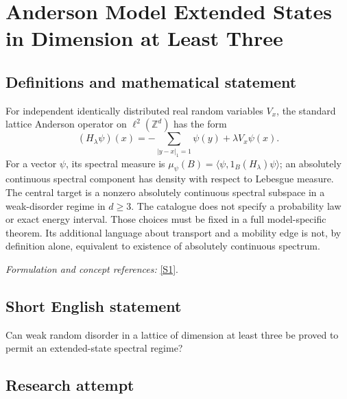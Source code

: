 \documentclass[11pt,a4paper]{article}
\newcommand{\Z}{\mathbb{Z}}
\newcommand{\sref}[2]{\hyperlink{source:#1:#2}{[S#2]}}
\newif\ifshowcatalogue
\newcommand{\cataloguescope}[1]{\ifshowcatalogue
 \paragraph{Exact scope in the supplied catalogue.}
 \begin{quote}\small #1\end{quote}\fi}
\numberwithin{equation}{section}
\begin{document}
\setcounter{section}{30}
\clearpage
\section{\texorpdfstring{Anderson Model Extended States in Dimension at Least Three}{Anderson Model Extended States in Dimension at Least Three}}\label{31}
\subsection{Definitions and mathematical statement}
For independent identically distributed real random variables $V_x$, the standard lattice Anderson operator on $\ell^2(\Z^d)$ has the form
\[
 (H_\lambda\psi)(x)=-\sum_{|y-x|_1=1}\psi(y)+\lambda V_x\psi(x).
\]
For a vector $\psi$, its spectral measure is $\mu_\psi(B)=\langle\psi,1_B(H_\lambda)\psi\rangle$; an absolutely continuous spectral component has density with respect to Lebesgue measure. The central target is a nonzero absolutely continuous spectral subspace in a weak-disorder regime in $d\ge3$. The catalogue does not specify a probability law or exact energy interval. Those choices must be fixed in a full model-specific theorem. Its additional language about transport and a mobility edge is not, by definition alone, equivalent to existence of absolutely continuous spectrum.
\par\smallskip\textit{Formulation and concept references:} \sref{31}{1}.
\cataloguescope{Prove that the Anderson model, the discrete random Schroedinger operator on Z\textasciicircum{}d with d >= 3, has a regime of absolutely continuous spectrum, equivalently that a conducting phase and a mobility edge exist at weak disorder, so that the metal-insulator transition is established.}
\subsection{Short English statement}
Can weak random disorder in a lattice of dimension at least three be proved to permit an extended-state spectral regime?
\subsection{Research attempt}
\end{document}
